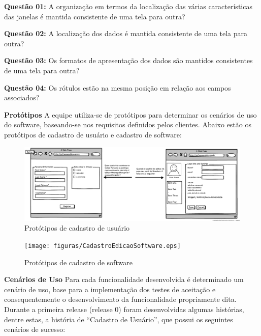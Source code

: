 \begin{itemize}
		\textbf{Questão 01:} A organização em termos da localização das várias características das janelas é mantida consistente de uma tela para outra? 
   
   		\textbf{Questão 02:} A localização dos dados é mantida consistente de uma tela para outra?  
   
   		\textbf{Questão 03:} Os formatos de apresentação dos dados são mantidos consistentes de uma tela para outra?

   		\textbf{Questão 04:} Os rótulos estão na mesma posição em relação aos campos associados?
	\end{itemize}

\textbf{Protótipos}
	A equipe utiliza-se de protótipos para determinar os cenários de uso do software, baseando-se nos requisitos definidos pelos clientes. Abaixo estão os protótipos de cadastro de usuário e cadastro de software:

	\begin{figure}[h!]
    	\centering
    	\includegraphics[keepaspectratio=true,scale=0.32]
      		{figuras/CadastroEdicaoUser.eps}
    	\caption{Protótipos de cadastro de usuário}
    	\label{cadastro user}
	\end{figure}

	\begin{figure}[h!]
    	\centering
    	\texttt{[image: figuras/CadastroEdicaoSoftware.eps]}
    	\caption{Protótipos de cadastro de software}
    	\label{cadastro software}
	\end{figure}

\newpage

\textbf{Cenários de Uso}
	Para cada funcionalidade desenvolvida é determinado um cenário de uso, base para a implementação dos testes de aceitação e consequentemente o desenvolvimento da funcionalidade propriamente dita.
	Durante a primeira release (release 0) foram desenvolvidas algumas histórias, dentre estas, a história de ``Cadastro de Usuário'', que possui os seguintes cenários de sucesso:

